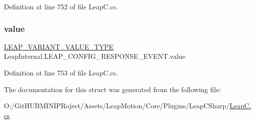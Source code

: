 Definition at line 752 of file Leap\+C.\+cs.

\mbox{\label{struct_leap_internal_1_1_l_e_a_p___c_o_n_f_i_g___r_e_s_p_o_n_s_e___e_v_e_n_t_a776be401a128a9e99b586bb5edc5140c}} 
\subsubsection{\texorpdfstring{value}{value}}
{\footnotesize\ttfamily \mbox{\hyperlink{struct_leap_internal_1_1_l_e_a_p___v_a_r_i_a_n_t___v_a_l_u_e___t_y_p_e}{L\+E\+A\+P\+\_\+\+V\+A\+R\+I\+A\+N\+T\+\_\+\+V\+A\+L\+U\+E\+\_\+\+T\+Y\+PE}} Leap\+Internal.\+L\+E\+A\+P\+\_\+\+C\+O\+N\+F\+I\+G\+\_\+\+R\+E\+S\+P\+O\+N\+S\+E\+\_\+\+E\+V\+E\+N\+T.\+value}



Definition at line 753 of file Leap\+C.\+cs.



The documentation for this struct was generated from the following file\+:\begin{DoxyCompactItemize}
\item 
O\+:/\+Git\+H\+U\+B\+M\+I\+N\+I\+P\+Roject/\+Assets/\+Leap\+Motion/\+Core/\+Plugins/\+Leap\+C\+Sharp/\mbox{\hyperlink{_leap_c_8cs}{Leap\+C.\+cs}}\end{DoxyCompactItemize}
